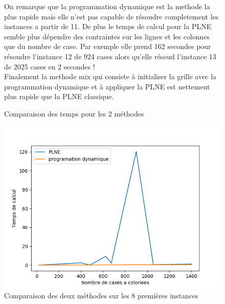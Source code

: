 \documentclass[a4paper]{memoir}
\begin{document}
\begin{figure}[h]
\begin{center}
\caption{Comparaison des temps pour les 2 méthodes}
  \end{center}
  On remarque que la programmation dynamique est la methode la plus rapide mais elle n'est pas capable de résoudre completement les instances a partir de 11. De plus le temps de calcul pour la PLNE semble plus dépendre des contraintes sur les lignes et les colonnes que du nombre de case. Par exemple elle prend 162 secondes pour résoudre l'instance 12 de 924 cases alors qu'elle résoud l'instance 13 de 2025 cases en 2 secondes ! \\
  Finalement la methode mix qui consiste à initialiser la grille avec la programmation dynamique et à appliquer la PLNE est nettement plus rapide que la PLNE classique.
\end{figure}



\begin{figure}[h]
  \centering
  \includegraphics[width=0.75\linewidth]{../images/comparaison.png}
  \caption{Comparaison des deux méthodes sur les 8 premières instances}
  \label{fig:graphes-comparaison}
\end{figure}
\end{document}
